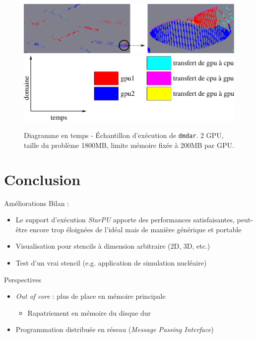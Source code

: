 \documentclass[9pt]{beamer}
\begin{document}
\begin{frame}
  \begin{figure}
    \centering
    \vfill
    \includegraphics[width=1\linewidth]{img/dmdar-gpu2.pdf}
    \newline
    \vfill
    \includegraphics[width=0.6\linewidth]{img/xpm-legend-gpu2.pdf}
    \vfill
    \caption{%
      \label{fig:dmdar-gpu2}%
      Diagramme en temps - Échantillon d'exécution de \texttt{dmdar}. 2 GPU,
      taille du problème 1800MB, limite mémoire fixée à 200MB par GPU.}
  \end{figure}
  \vfill
\end{frame}

\section{Conclusion}

\begin{frame}{\textcolor{inriaGrey}{Améliorations}}
  \vfill
  Bilan :
  \begin{itemize}
  \item Le support d'exécution \textit{StarPU} apporte des performances
    satisfaisantes, peut-être encore trop éloignées de l'idéal mais de manière
    générique et portable \vfill
  \end{itemize}
  \vfill
  \begin{itemize}
  \item Visualisation pour stencils à dimension arbitraire (2D, 3D, etc.)
    \vfill
  \item Test d'un vrai stencil (e.g. application de simulation nucléaire)
  \end{itemize}
  \vfill
\end{frame}

\begin{frame}{\textcolor{inriaGrey}{Perspectives}}
  \vfill
  \begin{itemize}
  \item \textit{Out of core} : plus de place en mémoire principale
    \begin{itemize}
    \item Rapatriement en mémoire du disque dur
    \end{itemize}
    \vfill
  \item Programmation distribuée en réseau (\textit{Message Passing Interface})
  \end{itemize}
  \vfill
\end{frame}
\end{document}
